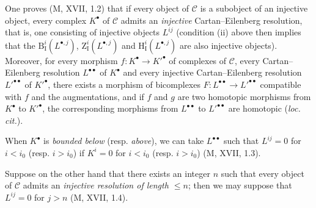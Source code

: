 \begin{env}[11.4.2]
One proves (M, XVII, 1.2) that if every object of $\mathcal C$ is a subobject
of an injective object, every complex $K^\bullet$ of $\mathcal C$ admits an
\emph{injective} Cartan--Eilenberg resolution, that is, one consisting of
injective objects $L^{ij}$ (condition (ii) above then implies that the
$\mathrm B_{\mathrm I}^i(L^{\bullet,j})$,
$\mathrm Z_{\mathrm I}^i(L^{\bullet,j})$ and
$\mathrm H_{\mathrm I}^i(L^{\bullet,j})$ are also injective objects).
Moreover, for every morphism $f:K^\bullet\to K'^\bullet$ of complexes of
$\mathcal C$, every Cartan--Eilenberg resolution $L^{\bullet\bullet}$ of
$K^\bullet$ and every injective Cartan--Eilenberg resolution
$L'^{\bullet\bullet}$ of $K'^\bullet$, there exists a morphism of bicomplexes
$F:L^{\bullet\bullet}\to L'^{\bullet\bullet}$ compatible with $f$ and the
augmentations, and if $f$ and $g$ are two homotopic morphisms from $K^\bullet$
to $K'^\bullet$, the corresponding morphisms from $L^{\bullet\bullet}$
to $L'^{\bullet\bullet}$ are homotopic (\emph{loc. cit.}).

When $K^\bullet$ is \emph{bounded below} (resp.
\emph{above}), we can take $L^{\bullet\bullet}$ such that
$L^{ij}=0$ for $i<i_0$ (resp. $i>i_0$) if $K^i=0$ for $i<i_0$ (resp.
$i>i_0$) (M, XVII, 1.3).

Suppose on the other hand that there exists an integer $n$ such that every object of
$\mathcal C$ admits an \emph{injective resolution of length $\leq n$};
then we may suppose that $L^{ij}=0$ for $j>n$ (M, XVII, 1.4).
\end{env}

